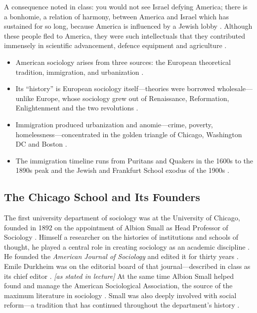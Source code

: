 \begin{CriticalPoint}
A consequence noted in class: you would not see Israel defying America; there is a bonhomie, a relation of harmony, between America and Israel which has sustained for so long, because America is influenced by a Jewish lobby .
Although these people fled to America, they were such intellectuals that they contributed immensely in scientific advancement, defence equipment and agriculture .
\end{CriticalPoint}

\begin{QuickRevision}
\begin{itemize}
    \item American sociology arises from three sources: the European theoretical tradition, immigration, and urbanization .
    \item Its ``history'' is European sociology itself---theories were borrowed wholesale---unlike Europe, whose sociology grew out of Renaissance, Reformation, Enlightenment and the two revolutions .
    \item Immigration produced urbanization and anomie---crime, poverty, homelessness---concentrated in the golden triangle of Chicago, Washington DC and Boston .
    \item The immigration timeline runs from Puritans and Quakers in the 1600s to the 1890s peak and the Jewish and Frankfurt School exodus of the 1900s .
\end{itemize}
\end{QuickRevision}

\subsection{The Chicago School and Its Founders}

\begin{DataFact}
The first university department of sociology was at the University of Chicago, founded in 1892 on the appointment of Albion Small as Head Professor of Sociology .
Himself a researcher on the histories of institutions and schools of thought, he played a central role in creating sociology as an academic discipline .
He founded the \textit{American Journal of Sociology} and edited it for thirty years . Emile Durkheim was on the editorial board of that journal---described in class as its chief editor . \textit{[as stated in lecture]}
At the same time Albion Small helped found and manage the American Sociological Association, the source of the maximum literature in sociology .
Small was also deeply involved with social reform---a tradition that has continued throughout the department's history .
\end{DataFact}

